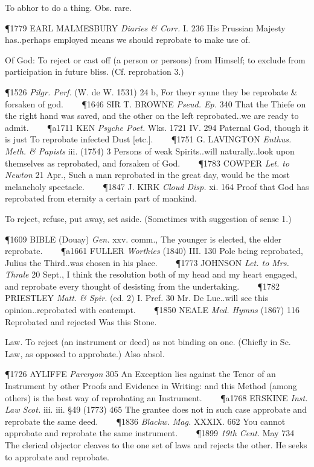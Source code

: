 \begin{description}[wide, labelwidth=!, labelindent=0pt]
\begin{myenumerate}
 To abhor to do a thing. Obs. rare.

\P 1779 EARL MALMESBURY  \textit{Diaries \& Corr.} I. 236 His Prussian Majesty has..perhaps employed means we should reprobate to make use of.

 Of God: To reject or cast off (a person or persons) from Himself; to exclude from participation in future bliss. (Cf. reprobation 3.)

\P 1526  \textit{Pilgr. Perf.} (W. de W. 1531) 24 b, For theyr synne they be reprobate \& forsaken of god.    
\P 1646 SIR T. BROWNE  \textit{Pseud. Ep.} 340 That the Thiefe on the right hand was saved, and the other on the left reprobated..we are ready to admit.    
\P a1711 KEN  \textit{Psyche Poet.} Wks. 1721 IV. 294  Paternal God, though it is just To reprobate infected Dust [etc.].    
\P 1751 G. LAVINGTON  \textit{Enthus. Meth. \& Papists} iii. (1754) 3 Persons of weak Spirits..will naturally..look upon themselves as reprobated, and forsaken of God.    
\P 1783 COWPER  \textit{Let. to Newton} 21 Apr., Such a man reprobated in the great day, would be the most melancholy spectacle.    
\P 1847 J. KIRK  \textit{Cloud Disp.} xi. 164 Proof that God has reprobated from eternity a certain part of mankind.

 To reject, refuse, put away, set aside. (Sometimes with suggestion of sense 1.)

\P 1609 BIBLE (Douay)  \textit{Gen.} xxv. comm., The younger is elected, the elder reprobate.    
\P a1661 FULLER  \textit{Worthies} (1840) III. 130 Pole being reprobated, Julius the Third..was chosen in his place.    
\P 1773 JOHNSON  \textit{Let. to Mrs. Thrale} 20 Sept., I think the resolution both of my head and my heart engaged, and reprobate every thought of desisting from the undertaking.    
\P 1782 PRIESTLEY  \textit{Matt. \& Spir.} (ed. 2) I. Pref. 30 Mr. De Luc..will see this opinion..reprobated with contempt.    
\P 1850 NEALE  \textit{Med. Hymns} (1867) 116 Reprobated and rejected Was this Stone.

 Law. To reject (an instrument or deed) as not binding on one. (Chiefly in Sc. Law, as opposed to approbate.) Also absol.

\P 1726 AYLIFFE  \textit{Parergon} 305 An Exception lies against the Tenor of an Instrument by other Proofs and Evidence in Writing: and this Method (among others) is the best way of reprobating an Instrument.    
\P a1768 ERSKINE  \textit{Inst. Law Scot.} iii. iii. §49 (1773) 465 The grantee does not in such case approbate and reprobate the same deed.    
\P 1836  \textit{Blackw. Mag.} XXXIX. 662 You cannot approbate and reprobate the same instrument.    
\P 1899 \textit{19th  Cent.} May 734 The clerical objector cleaves to the one set of laws and rejects the other. He seeks to approbate and reprobate.


\end{myenumerate}
\end{description}

